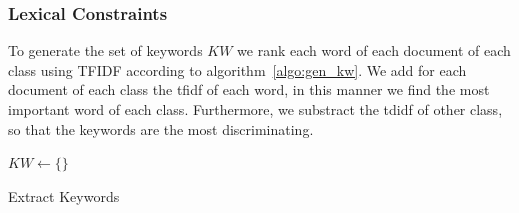 \subsubsection{Lexical Constraints}
To generate the set of keywords $KW$ we rank each word of each 
document of each class using TFIDF according to algorithm~\ref{algo:gen_kw}.
We add for each document of each class the tfidf of each word, in this manner
we find the most important word of each class. Furthermore, we substract 
the tdidf of other class, so that the keywords are the most discriminating.
\begin{algorithm}
  $KW \gets \{\}$\\
  \caption{\label{algo:gen_kw}Extract Keywords}
\end{algorithm}
